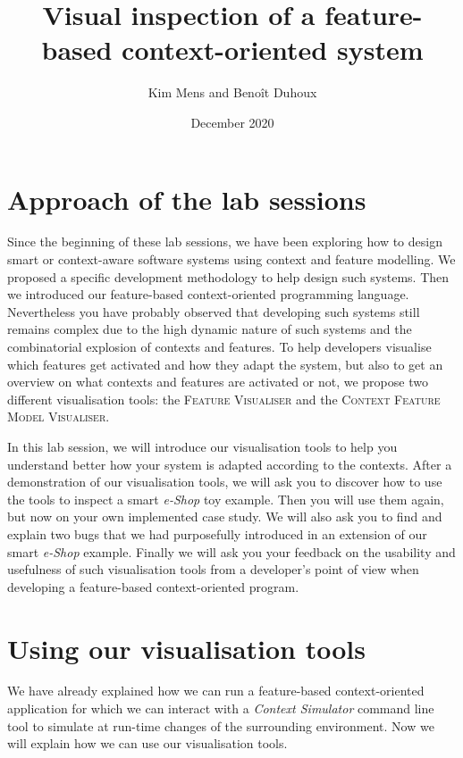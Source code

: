 \documentclass{article}
\title{Visual inspection of a feature-based context-oriented system}
\date{December 2020}
\author{Kim Mens and Beno\^{i}t Duhoux}
\begin{document}
\maketitle

\section{Approach of the lab sessions}

Since the beginning of these lab sessions, we have been exploring how to design smart or context-aware software systems using context and feature modelling. We proposed a specific development methodology to help design such systems. Then we introduced our feature-based context-oriented programming language. Nevertheless you have probably observed that developing such systems still remains complex due to the high dynamic nature of such systems and the combinatorial explosion of contexts and features. To help developers visualise which features get activated and how they adapt the system, but also to get an overview on what contexts and features are activated or not, we propose two different visualisation tools: the \textsc{Feature Visualiser} and the \textsc{Context Feature Model Visualiser}.

In this lab session, we will introduce our visualisation tools to help you understand better how your system is adapted according to the contexts. After a demonstration of our visualisation tools, we will ask you to discover how to use the tools to inspect a smart \emph{e-Shop} toy example. Then you will use them again, but now on your own implemented case study.
We will also ask you to find and explain two bugs that we had purposefully introduced in an extension of our smart \emph{e-Shop} example. Finally we will ask you your feedback on the usability and usefulness of such visualisation tools from a developer's point of view when developing a feature-based context-oriented program.

\section{Using our visualisation tools}
\label{s:running-fbcoapp}

We have already explained how we can run a feature-based context-oriented application for which we can interact with a \emph{Context Simulator} command line tool to simulate at run-time changes of the surrounding environment. Now we will explain how we can use our visualisation tools.
 
\end{document}
